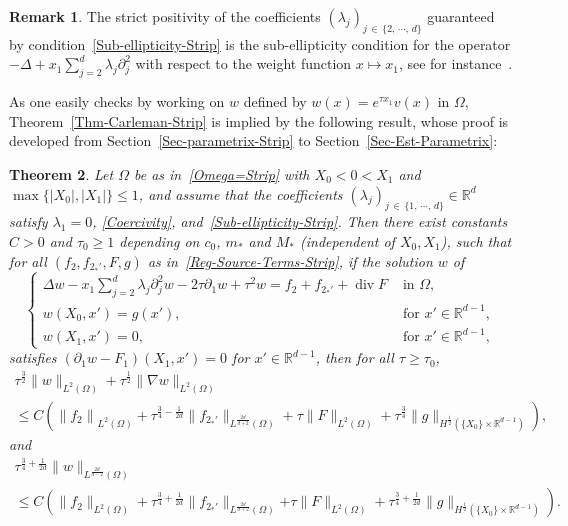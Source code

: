 \documentclass[10pt]{amsart}
\newtheorem{theo}{Theorem}[section]
\theoremstyle{definition}\newtheorem{defi}[theo]{Definition}\newtheorem{rema}[theo]{Remark}\newtheorem{exam}[theo]{Example}\newtheorem{exem}[theo]{Example}\newtheorem{nota}[theo]{Notation}
\newcommand*\R{\mathbb{R}}
\renewcommand{\leq}{\leqslant}
\renewcommand{\geq}{\geqslant}
\renewcommand{\div}{\operatorname{div}}
\begin{document}
\begin{rema}
The strict positivity of the coefficients $(\lambda_j)_{j\,\in\,\{2, \,\cdots,\, d\}}$ guaranteed by condition~\eqref{Sub-ellipticity-Strip} is the sub-ellipticity condition for the operator $-\Delta + x_1 \sum_{j =2}^d \lambda_j \partial_j^2$ with respect to the weight function $x\mapsto x_1$, see for instance~\cite[Part~1, Definition~3.30]{LeRousseaubookvolume1}.
\end{rema}

As one easily checks by working on $w$ defined by $w(x) = e^{\tau x_1} v(x)$ in $\Omega$, Theorem~\ref{Thm-Carleman-Strip} is implied by the following result, whose proof is developed from Section~\ref{Sec-parametrix-Strip} to Section~\ref{Sec-Est-Parametrix}:

\begin{theo}\label{Thm-Carleman-Strip-2}
Let $\Omega$ be as in~\eqref{Omega=Strip} with $X_0 \! <\! 0\! <\! X_1$ and $\max\{|X_0|, |X_1|\} \leq 1$, and assume that the coefficients $(\lambda_j)_{j\,\in\,\{1,\,\cdots,\,d\}} \in \R^d$ satisfy $\lambda_1 = 0$, \eqref{Coercivity}, and~\eqref{Sub-ellipticity-Strip}. Then there exist constants $C>0$ and $\tau_0 \geq 1$ depending on $c_0$, $m_*$ and $M_*$ (independent of $X_0, X_1$), such that for all $(f_2, f_{2_*'},F,g)$ as in~\eqref{Reg-Source-Terms-Strip}, if the solution $w$ of
\begin{equation}\label{Elliptic-Strip-w}
\left\{
\begin{array}{ll}
\Delta w-x_{1} \sum\limits_{j=2}^{d} \lambda_{j} \partial_{j}^{2} w - 2 \tau \partial_1 w + \tau^2 w = f_2 + f_{2_*'} + \div F & \text { in } \Omega,
\\
w\left(X_{0}, x'\right)=g (x'), &\text{ for } x' \in \R^{d-1},
\\
w\left(X_{1}, x'\right)= 0, &\text{ for } x' \in \R^{d-1},
\end{array}
\right.
\end{equation}
satisfies $(\partial_1 w - F_1)(X_1, x') = 0$ for $x' \in \R^{d-1}$, then for all $\tau \geq \tau_0$,
\begin{multline}\label{Carleman-Strip-w-1}
\tau^{\frac{3}{2}} \| w\|_{L^2(\Omega)} +
\tau^{\frac{1}{2}} \| \nabla w \|_{L^2(\Omega)}
\\ \leq C\left(
\left\| f_2 \right\|_{L^2(\Omega)} +
\tau^{\frac{3}{4}-\frac{1}{2d}} \| f_{2_*'} \|_{L^{\frac{2d}{d+2}}(\Omega)} +
\tau \| F \|_{L^2(\Omega)} +
\tau^{\frac{3}{4}} \| g \|_{H^{\frac{1}{2}}\left(\{X_0\} \times \R^{d-1}\right)}
\right),
\end{multline}
and
\begin{multline}\label{Carleman-Strip-w-2}
\tau^{\frac{3}{4}+\frac{1}{2d}} \| w\|_{L^{\frac{2d}{d-2}}(\Omega)}
\\
\leq C\left(
\| f_2 \|_{L^2(\Omega)} +
\tau^{\frac{3}{4}+\frac{1}{2d}} \| f_{2_*'} \|_{L^{\frac{2d}{d+2}}(\Omega)}
\right.
\left. +
\tau \| F \|_{L^2(\Omega)} +
\tau^{\frac{3}{4}+\frac{1}{2d}} \| g \|_{H^{\frac{1}{2}}(\{X_0\} \times \R^{d-1})}
\right).
\end{multline}
\end{theo}
\end{document}
